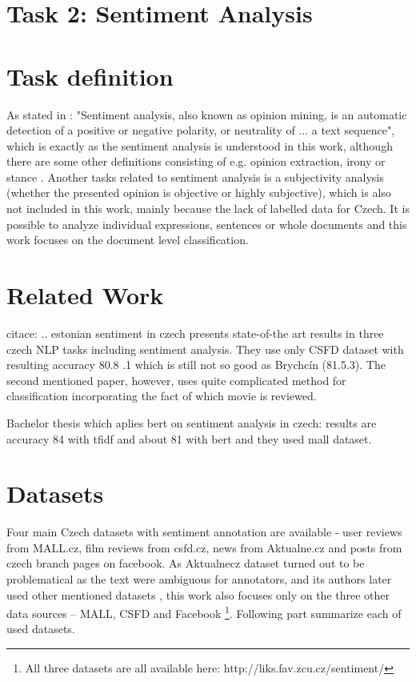 \section{Task 2: Sentiment Analysis}
\label{chap:sent}
\section{Task definition}
As stated in \citep{Veselovska}: "Sentiment analysis, also known as opinion mining, is an automatic detection of a positive or negative polarity, or neutrality of ... a text sequence", which is exactly as the sentiment analysis is understood in this work, although there are some other definitions consisting of e.g. opinion extraction, irony or stance \citep{Montoyo2012}. Another tasks related to sentiment analysis is a subjectivity analysis (whether the presented opinion is objective or highly subjective), which is also not included in this work, mainly because the lack of labelled data for Czech. It is possible to analyze individual expressions, sentences or whole documents \citep{Veselovska} and this work focuses on the document level classification.

\section{Related Work}
citace:
\citep{Cano2019}
\citep{Kittask2020} .. estonian
\citep{Lenc2016} sentiment in czech
\citep{Hercig2018}
\citep{Li}
\citep{Libovicky} presents state-of-the art results in three czech NLP tasks including sentiment analysis. They use only CSFD dataset with resulting accuracy 80.8 .1 which is still not so good as Brychcín (81.5.3). The second mentioned paper, however, uses quite complicated method for classification incorporating the fact of which movie is reviewed. 

Bachelor thesis which aplies bert on sentiment analysis in czech:
results are accuracy 84 with tfidf and about 81 with bert and they used mall dataset.

\section{Datasets}
Four main Czech datasets with sentiment annotation are available - user reviews from MALL.cz, film reviews from csfd.cz, news from Aktualne.cz and posts from czech branch pages on facebook. As Aktualnecz dataset turned out to be problematical as the text were ambiguous for annotators, and its authors later used other mentioned datasets \citep{Veselovska}, this work also focuses only on the three other data sources -- MALL, CSFD and Facebook \footnote{All three datasets are all available here: http://liks.fav.zcu.cz/sentiment/}. Following part summarize each of used datasets.
